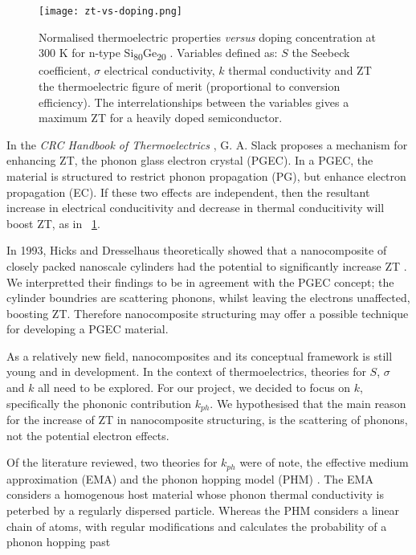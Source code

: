 \documentclass[12pt,draft]{article}
\newcommand{\figref}[2][\figurename~]{#1\ref{#2}}
\begin{document}
\begin{figure}
	\centering
	\texttt{[image: zt-vs-doping.png]}
	\caption{Normalised thermoelectric properties \emph{versus} doping concentration at 300 K for n-type Si\textsubscript{80}Ge\textsubscript{20} \cite{minnich-review}. Variables defined as: $S$ the Seebeck coefficient, $\sigma$ electrical conductivity, $k$ thermal conductivity and ZT the thermoelectric figure of merit (proportional to conversion efficiency). The interrelationships between the variables gives a maximum ZT for a heavily doped semiconductor.}
	\label{fig:zt-vs-doping}
\end{figure}

In the \emph{CRC Handbook of Thermoelectrics} \cite{crc-handbook}, G. A. Slack proposes a mechanism for enhancing ZT, the phonon glass electron crystal (PGEC). In a PGEC, the material is structured to restrict phonon propagation (PG), but enhance electron propagation (EC). If these two effects are independent, then the resultant increase in electrical conducitivity and decrease in thermal conducitivity will boost ZT, as in \figref{fig:zt-vs-doping}.

In 1993, Hicks and Dresselhaus theoretically showed that a nanocomposite of closely packed nanoscale cylinders had the potential to significantly increase ZT \cite{nanowires}. We interpretted their findings to be in agreement with the PGEC concept; the cylinder boundries are scattering phonons, whilst leaving the electrons unaffected, boosting ZT. Therefore nanocomposite structuring may offer a possible technique for developing a PGEC material.

As a relatively new field, nanocomposites and its conceptual framework is still young and in development. In the context of thermoelectrics, theories for $S$, $\sigma$ and $k$ all need to be explored. For our project, we decided to focus on $k$, specifically the phononic contribution $k_{ph}$. We hypothesised that the main reason for the increase of ZT in nanocomposite structuring, is the scattering of phonons, not the potential electron effects.

Of the literature reviewed, two theories for $k_{ph}$ were of note, the effective medium approximation (EMA) \cite{ema} and the phonon hopping model (PHM) \cite{phm}. The EMA considers a homogenous host material whose phonon thermal conductivity is peterbed by a regularly dispersed particle. Whereas the PHM considers a linear chain of atoms, with regular modifications and calculates the probability of a phonon hopping past
\end{document}
